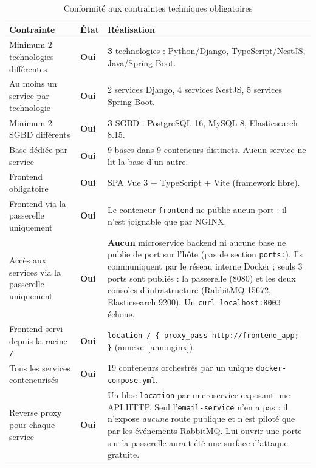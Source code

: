 \documentclass[11pt,a4paper,oneside]{report}
\newcommand{\code}[1]{\texttt{\small #1}}
\begin{document}
\begin{table}[H]
\centering
\small
\begin{tabularx}{\linewidth}{@{}p{5.6cm}p{1.1cm}X@{}}
\toprule
\textbf{Contrainte} & \textbf{État} & \textbf{Réalisation} \\
\midrule
Minimum 2 technologies différentes & \textbf{Oui} &
  \textbf{3} technologies : Python/Django, TypeScript/NestJS, Java/Spring Boot. \\
\addlinespace
Au moins un service par technologie & \textbf{Oui} &
  2 services Django, 4 services NestJS, 5 services Spring Boot. \\
\addlinespace
Minimum 2 SGBD différents & \textbf{Oui} &
  \textbf{3} SGBD : PostgreSQL 16, MySQL 8, Elasticsearch 8.15. \\
\addlinespace
Base dédiée par service & \textbf{Oui} &
  9 bases dans 9 conteneurs distincts. Aucun service ne lit la base d'un autre. \\
\addlinespace
Frontend obligatoire & \textbf{Oui} &
  SPA Vue 3 + TypeScript + Vite (framework libre). \\
\addlinespace
Frontend via la passerelle uniquement & \textbf{Oui} &
  Le conteneur \code{frontend} ne publie aucun port : il n'est joignable que
  par NGINX. \\
\addlinespace
Accès aux services via la passerelle uniquement & \textbf{Oui} &
  \textbf{Aucun} microservice backend ni aucune base ne publie de port sur
  l'hôte (pas de section \code{ports:}). Ils communiquent par le réseau interne
  Docker ; seuls 3 ports sont publiés : la passerelle (8080) et les deux
  consoles d'infrastructure (RabbitMQ 15672, Elasticsearch 9200). Un
  \code{curl localhost:8003} échoue. \\
\addlinespace
Frontend servi depuis la racine \code{/} & \textbf{Oui} &
  \code{location / \{ proxy\_pass http://frontend\_app; \}} (annexe~\ref{ann:nginx}). \\
\addlinespace
Tous les services conteneurisés & \textbf{Oui} &
  19 conteneurs orchestrés par un unique \code{docker-compose.yml}. \\
\addlinespace
Reverse proxy pour chaque service & \textbf{Oui} &
  Un bloc \code{location} par microservice exposant une API HTTP.
  Seul l'\code{email-service} n'en a pas : il n'expose \emph{aucune} route
  publique et n'est piloté que par les événements RabbitMQ. Lui ouvrir une
  porte sur la passerelle aurait été une surface d'attaque gratuite. \\
\bottomrule
\end{tabularx}
\caption{Conformité aux contraintes techniques obligatoires}
\end{table}
\end{document}
